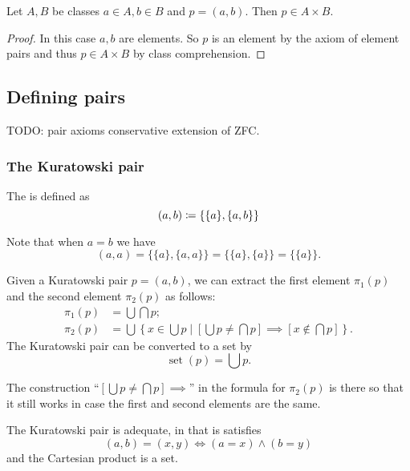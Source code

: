 \begin{lemma}
Let $A, B$ be classes $a\in A, b\in B$ and $p = (a,b)$. Then $p\in A\times B$.
\end{lemma}
\begin{proof}
In this case $a,b$ are elements. So $p$ is an element by the axiom of element pairs and thus $p\in A\times B$ by class comprehension.
\end{proof}


\subsection{Defining pairs}
TODO: pair axioms conservative extension of ZFC.

\subsubsection{The Kuratowski pair}
\begin{definition}
The  is defined as
\[ (a,b) \coloneqq \{\{a\}, \{a,b\}\} \]
\end{definition}
Note that when $a=b$ we have
\[ (a,a) = \{\{a\},\{a,a\}\} = \{\{a\},\{a\}\} = \{\{a\}\}. \]
\begin{lemma}
Given a Kuratowski pair $p = (a,b)$, we can extract the first element $\pi_1(p)$ and the second element $\pi_2(p)$ as follows:
\begin{align*}
\pi_1(p) &= \bigcup\bigcap p; \\
\pi_2(p) &= \bigcup\left\{ x\in\bigcup p\;|\; \left[\bigcup p \neq \bigcap p\right] \implies \left[ x\notin \bigcap p \right] \right\}.
\end{align*}
The Kuratowski pair can be converted to a set by
\[ \operatorname{set}(p) = \bigcup p. \]
\end{lemma}
The construction ``$\left[\bigcup p \neq \bigcap p\right] \implies$'' in the formula for $\pi_2(p)$ is there so that it still works in case the first and second elements are the same.
\begin{proposition}
The Kuratowski pair is adequate, in that is satisfies
\[ (a,b) = (x,y) \iff (a=x)\land (b=y) \]
and the Cartesian product is a set.
\end{proposition}
